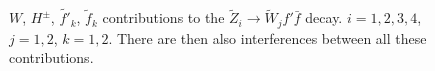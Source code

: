 \documentclass[final,3p,times,pdflatex]{elsarticle}
\begin{document}
\begin{figure}
  \caption{$W$, $H^{\pm}$, $\tilde{f'}_k$, $\tilde{f}_k$ contributions to the $\tilde{Z}_i \rightarrow \tilde{W}_j f' \bar{f}$ decay. $i=1,2,3,4$, $j=1,2$, $k=1,2$. There are then also interferences between all these contributions.} \label{neutcharfeyn3}
\end{figure} 
\end{document}
